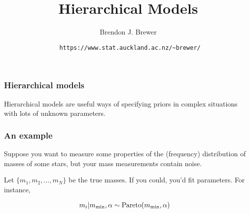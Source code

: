 \documentclass{beamer}
\title{Hierarchical Models}
\author{Brendon J. Brewer}
\institute{Department of Statistics\\
The University of Auckland}
\date{{\tt \color{blue} https://www.stat.auckland.ac.nz/\~{ }brewer/}}
\begin{document}

\begin{frame}[t,plain]
\titlepage
\end{frame}


\begin{frame}[t,plain]
\frametitle{Hierarchical models}
\vspace{2em}
Hierarchical models are useful ways of specifying priors in complex situations
with lots of unknown parameters.

\end{frame}



\begin{frame}[t,plain]
\frametitle{An example}
Suppose you want to measure some properties of the (frequency) distribution of
masses of some stars, but your mass measurements contain noise.

Let $\{m_1, m_2, ..., m_N\}$ be the true masses. If you could, you'd fit
parameters. For instance,

\begin{align}
m_i | m_{\rm min},\alpha &\sim \textnormal{Pareto}(m_{\rm min}, \alpha)
\end{align}

\end{frame}
\end{document}
